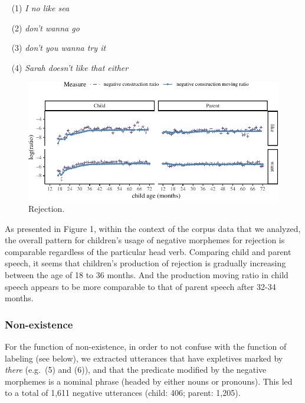 \documentclass[10pt, letterpaper]{article}
\newenvironment{CodeChunk}{}{}
\begin{document}
~ (1) \emph{I no like sea}

~ (2) \emph{don't wanna go}

~ (3) \emph{don't you wanna try it}

~ (4) \emph{Sarah doesn't like that either}

\begin{figure}[h]

\begin{CodeChunk}


\begin{center}\includegraphics{figs/emotion-1} \end{center}

\end{CodeChunk}
\caption[This image spans both columns]{Rejection.}\label{fig:rejection}
\end{figure}

As presented in Figure 1, within the context of the corpus data that we
analyzed, the overall pattern for children's usage of negative morphemes
for rejection is comparable regardless of the particular head verb.
Comparing child and parent speech, it seems that children's production
of rejection is gradually increasing between the age of 18 to 36 months.
And the production moving ratio in child speech appears to be more
comparable to that of parent speech after 32-34 months.

\hypertarget{non-existence}{%
\subsubsection{Non-existence}\label{non-existence}}

For the function of non-existence, in order to not confuse with the
function of labeling (see below), we extracted utterances that have
expletives marked by \emph{there} (e.g.~(5) and (6)), and that the
predicate modified by the negative morphemes is a nominal phrase (headed
by either nouns or pronouns). This led to a total of 1,611 negative
utterances (child: 406; parent: 1,205).
\end{document}
